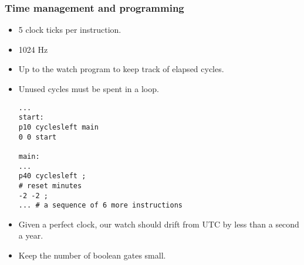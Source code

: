 \documentclass{beamer}
\begin{document}
\begin{frame}[fragile]
  \frametitle{Time management and programming}
  \begin{itemize}
    \item 5 clock ticks per instruction.
    \item 1024 Hz
    \item Up to the watch program to keep track of elapsed cycles.
    \item Unused cycles must be spent in a loop.
    \begin{verbatim}
...
start:
p10 cyclesleft main
0 0 start

main:
...
p40 cyclesleft ;
# reset minutes
-2 -2 ;
... # a sequence of 6 more instructions
    \end{verbatim}
    \item Given a perfect clock, our watch should drift from UTC by
      less than a second a year.
    \item Keep the number of boolean gates small.
  \end{itemize}
\end{frame}
\end{document}
